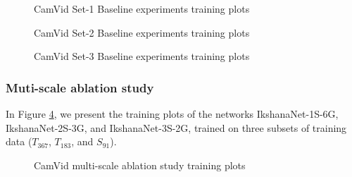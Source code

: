 \documentclass{article}
\begin{document}
\begin{figure}[ht]
\centering     {}
\caption{CamVid Set-1 Baseline experiments training plots}
\label{C4}
\end{figure}

\begin{figure}[ht]
\centering
{}
\caption{CamVid Set-2 Baseline experiments training plots}
\label{C5}
\end{figure}

\begin{figure}[ht]
\centering
{}
\caption{CamVid Set-3 Baseline experiments training plots}
\label{C6}
\end{figure}

\subsubsection{Muti-scale ablation study}
In Figure \ref{C7}, we present the training plots of the networks IkshanaNet-1S-6G,  IkshanaNet-2S-3G, and IkshanaNet-3S-2G, trained on three subsets of training data ($T_{367}$, $T_{183}$, and $S_{91}$). 
\begin{figure}[ht]
\centering     {}
\caption{CamVid multi-scale ablation study training plots}
\label{C7}
\end{figure}
\end{document}
